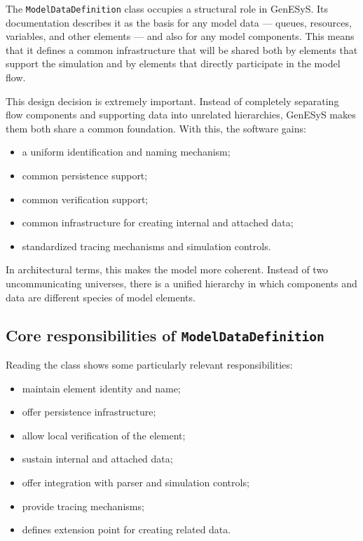 The \texttt{ModelDataDefinition} class occupies a structural role in GenESyS. Its documentation describes it as the basis for any model data — queues, resources, variables, and other elements — and also for any model components. This means that it defines a common infrastructure that will be shared both by elements that support the simulation and by elements that directly participate in the model flow.

This design decision is extremely important. Instead of completely separating flow components and supporting data into unrelated hierarchies, GenESyS makes them both share a common foundation. With this, the software gains:
\begin{itemize}
 \item a uniform identification and naming mechanism;
 \item common persistence support;
 \item common verification support;
 \item common infrastructure for creating internal and attached data;
 \item standardized tracing mechanisms and simulation controls.
\end{itemize}

In architectural terms, this makes the model more coherent. Instead of two uncommunicating universes, there is a unified hierarchy in which components and data are different species of model elements.

\subsection{Core responsibilities of \texttt{ModelDataDefinition}}
\label{subsec:cap8_responsabilidades_modeldatadefinition}

Reading the class shows some particularly relevant responsibilities:
\begin{itemize}
 \item maintain element identity and name;
 \item offer persistence infrastructure;
 \item allow local verification of the element;
 \item sustain internal and attached data;
 \item offer integration with parser and simulation controls;
 \item provide tracing mechanisms;
 \item defines extension point for creating related data.
\end{itemize}

